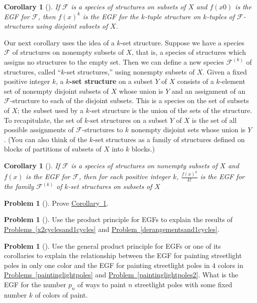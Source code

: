 \documentclass[10pt,]{book}
\newcommand{\terminology}[1]{\textbf{#1}}
\theoremstyle{plain}
\newtheorem{corollary}[theorem]{Corollary}
\theoremstyle{definition}
\newtheorem{activity}[project]{Problem}
\theoremstyle{definition}
\numberwithin{equation}{chapter}
\newcommand{\F}{\mathcal{F}}
\begin{document}
\begin{corollary}[{}]\label{fspeciescorollary1}
If \(\F\) is a species of structures on subsets of \(X\) and \(f(x0)\) is the EGF for \(\F\), then \(f(x)^k\) is the EGF for the \(k\)-tuple structure on \(k\)-tuples of \(\F\)-structures using disjoint subsets of \(X\).%
\end{corollary}
Our next corollary uses the idea of a \(k\)-set structure. Suppose we have a species \(\F\) of structures on nonempty subsets of \(X\), that is, a species of structures which assigns no structures to the empty set. Then we can define a new species \(\F^{(k)}\) of structures, called ``\(k\)-set structures,'' using nonempty subsets of \(X\). Given a fixed positive integer \(k\), a \terminology{\(k\)-set structure} on a subset \(Y\) of \(X\) consists of a \(k\)-element set of nonempty disjoint subsets of \(X\) whose union is \(Y\) and an assignment of an \(\F\)-structure to each of the disjoint subsets. This is a species on the set of subsets of \(X\); the subset used by a \(k\)-set structure is the union of the sets of the structure. To recapitulate, the set of \(k\)-set structures on a subset \(Y\) of \(X\) is the set of all possible assignments of \(\F\)-structures to \(k\) nonempty disjoint sets whose union is \(Y\). (You can also think of the \(k\)-set structures as a family of structures defined on blocks of partitions of subsets of \(X\) into \(k\) blocks.)%
\begin{corollary}[{}]\label{fspeciescorollary2}
If \(\F\) is a species of structures on nonempty subsets of \(X\) and \(f(x)\) is the EGF for \(\F\), then for each positive integer \(k\), \(\frac{f(x)^k}{k!}\) is the EGF for the family \(\F^{(k)}\) of \(k\)-set structures on subsets of \(X\)%
\end{corollary}
\begin{activity}[]\marginsymbol[-1em]{} \label{activity-399}
Prove \hyperref[fspeciescorollary2]{Corollary~\ref{fspeciescorollary2}}.%
\end{activity}
\begin{activity}[] \label{activity-400}
Use the product principle for EGFs to explain the results of \hyperref[x2cyclesand1cycles]{Problems~\ref{x2cyclesand1cycles}} and \hyperref[derangementsand1cycles]{Problem~\ref{derangementsand1cycles}}.%
\end{activity}
\begin{activity}[] \label{activity-401}
Use the general product principle for EGFs or one of its corollaries to explain the relationship between the EGF for painting streetlight poles in only one color and the EGF for painting streetlight poles in \(4\) colors in \hyperref[paintinglightpoles]{Problems~\ref{paintinglightpoles}} and \hyperref[paintinglightpoles2]{Problem~\ref{paintinglightpoles2}}. What is the EGF for the number \(p_n\) of ways to paint \(n\) streetlight poles with some fixed number \(k\) of colors of paint.%
\end{activity}
\end{document}
